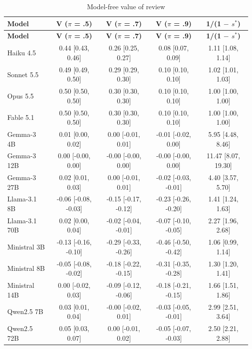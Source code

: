\documentclass[10pt,a4paper]{article}
\begin{document}
\begin{footnotesize}
\setlength{\tabcolsep}{2pt}
\begin{longtable}{lcccc}
\caption{Model-free value of review}\\
\toprule
\textbf{Model} & \textbf{V ($\pi$ = .5)} & \textbf{V ($\pi$ = .7)} & \textbf{V ($\pi$ = .9)} & \textbf{1/(1 $-$ $s^{*}$)} \\
\midrule
\endfirsthead
\toprule
\textbf{Model} & \textbf{V ($\pi$ = .5)} & \textbf{V ($\pi$ = .7)} & \textbf{V ($\pi$ = .9)} & \textbf{1/(1 $-$ $s^{*}$)} \\
\midrule
\endhead
\bottomrule
\endfoot
Haiku 4.5 & 0.44 [0.43, 0.46] & 0.26 [0.25, 0.27] & 0.08 [0.07, 0.09] & 1.11 [1.08, 1.14] \\
Sonnet 5.5 & 0.49 [0.49, 0.50] & 0.29 [0.29, 0.30] & 0.10 [0.10, 0.10] & 1.02 [1.01, 1.03] \\
Opus 5.5 & 0.50 [0.50, 0.50] & 0.30 [0.30, 0.30] & 0.10 [0.10, 0.10] & 1.00 [1.00, 1.00] \\
Fable 5.1 & 0.50 [0.50, 0.50] & 0.30 [0.30, 0.30] & 0.10 [0.10, 0.10] & 1.00 [1.00, 1.00] \\
Gemma-3 4B & 0.01 [0.00, 0.02] & 0.00 [-0.01, 0.01] & -0.01 [-0.02, 0.00] & 5.95 [4.48, 8.46] \\
Gemma-3 12B & 0.00 [-0.00, 0.00] & -0.00 [-0.00, 0.00] & -0.00 [-0.00, 0.00] & 11.47 [8.07, 19.30] \\
Gemma-3 27B & 0.02 [0.01, 0.03] & 0.00 [-0.01, 0.01] & -0.02 [-0.03, -0.01] & 4.40 [3.57, 5.70] \\
Llama-3.1 8B & -0.06 [-0.08, -0.03] & -0.15 [-0.17, -0.12] & -0.23 [-0.26, -0.20] & 1.41 [1.24, 1.63] \\
Llama-3.1 70B & 0.02 [0.00, 0.04] & -0.02 [-0.04, -0.01] & -0.07 [-0.10, -0.05] & 2.27 [1.96, 2.68] \\
Ministral 3B & -0.13 [-0.16, -0.10] & -0.29 [-0.33, -0.26] & -0.46 [-0.50, -0.42] & 1.06 [0.99, 1.14] \\
Ministral 8B & -0.05 [-0.08, -0.02] & -0.18 [-0.22, -0.15] & -0.31 [-0.35, -0.28] & 1.30 [1.20, 1.41] \\
Ministral 14B & 0.00 [-0.02, 0.03] & -0.09 [-0.12, -0.06] & -0.18 [-0.21, -0.15] & 1.66 [1.51, 1.86] \\
Qwen2.5 7B & 0.03 [0.01, 0.04] & -0.00 [-0.02, 0.01] & -0.03 [-0.05, -0.01] & 2.99 [2.51, 3.64] \\
Qwen2.5 72B & 0.05 [0.03, 0.07] & 0.00 [-0.01, 0.02] & -0.05 [-0.07, -0.03] & 2.50 [2.21, 2.88] \\
\end{longtable}
\end{footnotesize}
\end{document}
